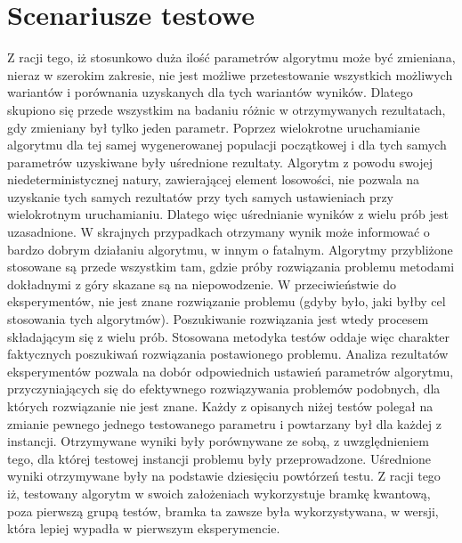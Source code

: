\section{Scenariusze testowe}
\label{sec:scenariusze}
Z racji tego, iż stosunkowo duża ilość parametrów algorytmu może być zmieniana, nieraz w szerokim zakresie, nie jest możliwe przetestowanie wszystkich możliwych wariantów i porównania uzyskanych dla tych wariantów wyników. Dlatego skupiono się przede wszystkim na badaniu różnic w otrzymywanych rezultatach, gdy zmieniany był tylko jeden parametr. Poprzez wielokrotne uruchamianie algorytmu dla tej samej wygenerowanej populacji początkowej i dla tych samych parametrów uzyskiwane były uśrednione rezultaty. Algorytm z powodu swojej niedeterministycznej natury, zawierającej element losowości, nie pozwala na uzyskanie tych samych rezultatów przy tych samych ustawieniach przy wielokrotnym uruchamianiu. Dlatego więc uśrednianie wyników z wielu prób jest uzasadnione. W skrajnych przypadkach otrzymany wynik może informować o bardzo dobrym działaniu algorytmu, w innym o fatalnym. Algorytmy przybliżone stosowane są przede wszystkim tam, gdzie próby rozwiązania problemu metodami dokładnymi z góry skazane są na niepowodzenie. W przeciwieństwie do eksperymentów, nie jest znane rozwiązanie problemu (gdyby było, jaki byłby cel stosowania tych algorytmów). Poszukiwanie rozwiązania jest wtedy procesem składającym się z wielu prób. Stosowana metodyka testów oddaje więc charakter faktycznych poszukiwań rozwiązania postawionego problemu. Analiza rezultatów eksperymentów pozwala na dobór odpowiednich ustawień parametrów algorytmu, przyczyniających się do efektywnego rozwiązywania problemów podobnych, dla których rozwiązanie nie jest znane. Każdy z opisanych niżej testów polegał na zmianie pewnego jednego testowanego parametru i powtarzany był dla każdej z instancji. Otrzymywane wyniki były porównywane ze sobą, z uwzględnieniem tego, dla której testowej instancji problemu były przeprowadzone. Uśrednione wyniki otrzymywane były na podstawie dziesięciu powtórzeń testu. Z racji tego iż, testowany algorytm w swoich założeniach wykorzystuje bramkę kwantową, poza pierwszą grupą testów, bramka ta zawsze była wykorzystywana, w wersji, która lepiej wypadła w pierwszym eksperymencie.

